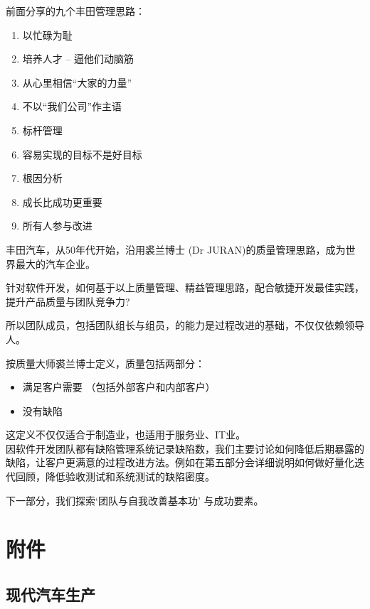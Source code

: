 前面分享的九个丰田管理思路：

\begin{enumerate}
\tightlist
\item
  以忙碌为耻
\item
  培养人才 -- 逼他们动脑筋
\item
  从心里相信``大家的力量''
\item
  不以``我们公司''作主语
\item
  标杆管理 
\item
  容易实现的目标不是好目标
\item
  根因分析
\item
  成长比成功更重要
\item
  所有人参与改进
\end{enumerate}

丰田汽车，从50年代开始，沿用裘兰博士 (Dr
JURAN)的质量管理思路，成为世界最大的汽车企业。

针对软件开发，如何基于以上质量管理、精益管理思路，配合敏捷开发最佳实践，提升产品质量与团队竞争力?

所以团队成员，包括团队组长与组员，的能力是过程改进的基础，不仅仅依赖领导人。

按质量大师裘兰博士定义，质量包括两部分：

\begin{itemize}
\tightlist
\item
  满足客户需要 （包括外部客户和内部客户）
\item
  没有缺陷\\
\end{itemize}

这定义不仅仅适合于制造业，也适用于服务业、IT业。\\
因软件开发团队都有缺陷管理系统记录缺陷数，我们主要讨论如何降低后期暴露的缺陷，让客户更满意的过程改进方法。例如在第五部分会详细说明如何做好量化迭代回顾，降低验收测试和系统测试的缺陷密度。

下一部分，我们探索`团队与自我改善基本功' 与成功要素。

\hypertarget{ux9644ux4ef6}{%
\section{附件}\label{ux9644ux4ef6}}

\hypertarget{ux73b0ux4ee3ux6c7dux8f66ux751fux4ea7}{%
\subsection{现代汽车生产}\label{ux73b0ux4ee3ux6c7dux8f66ux751fux4ea7}}

